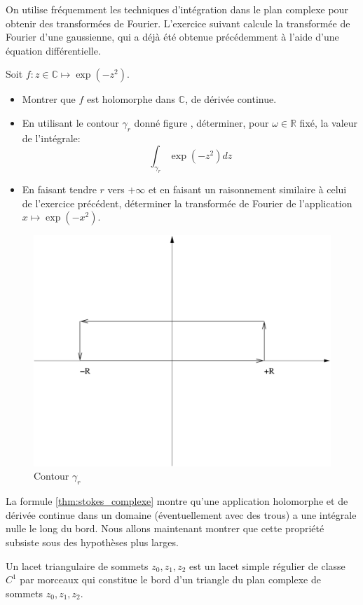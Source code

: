 On utilise fréquemment les techniques d'intégration dans le plan complexe pour
obtenir des transformées de Fourier. L'exercice suivant calcule la transformée
de Fourier d'une gaussienne, qui a déjà été obtenue précédemment à l'aide d'une
équation différentielle. 
\begin{exercice}
Soit $f \colon z \in \mathbb{C} \mapsto \exp(-z^2)$.
\begin{itemize}
  \item Montrer que $f$ est holomorphe dans $\mathbb{C}$, de dérivée continue.
  \item En utilisant le contour $\gamma_r$ donné figure , déterminer, pour
  $\omega \in \mathbb{R}$ fixé, la valeur de l'intégrale:
  \[
  \int_{\gamma_r} \exp(-z^2)dz
  \]
  \item En faisant tendre $r$ vers $+\infty$ et en faisant un raisonnement
  similaire à celui de l'exercice précédent, déterminer la transformée de
  Fourier de l'application $x \mapsto \exp(-x^2)$.
\end{itemize}
\end{exercice}
 \begin{figure}[ht]
\includegraphics[scale=0.3]{images/contour_gauss.pdf}
\caption{Contour $\gamma_r$}\label{fig:contour3}
\end{figure}

La formule \ref{thm:stokes_complexe} montre qu'une application holomorphe et de dérivée continue dans un domaine (éventuellement avec des trous) a une intégrale nulle le long du bord. Nous allons maintenant montrer que cette propriété subsiste sous des hypothèses plus larges. 
\begin{fdefn}
Un lacet triangulaire de sommets $z_0,z_1,z_2$ est un lacet simple régulier de
classe $C^1$ par morceaux qui constitue le bord d'un triangle du plan complexe
de sommets $z_0,z_1,z_2$.
\end{fdefn}

